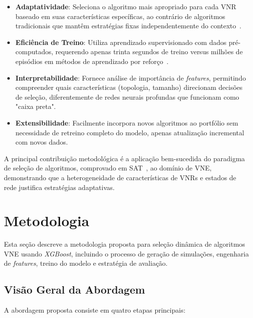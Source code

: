 \documentclass[conference]{IEEEtran}
\begin{document}
\begin{itemize}
    \item \textbf{Adaptatividade}: Seleciona o algoritmo mais apropriado para cada VNR baseado em suas características específicas, ao contrário de algoritmos tradicionais que mantêm estratégias fixas independentemente do contexto~\cite{fischer2013vne-survey}.

    \item \textbf{Eficiência de Treino}: Utiliza aprendizado supervisionado com dados pré-computados, requerendo apenas trinta segundos de treino versus milhões de episódios em métodos de aprendizado por reforço~\cite{cao2018nfv-deeprl,tsc-2023-hrl-acra,ijcai-2024-flagvne}.

    \item \textbf{Interpretabilidade}: Fornece análise de importância de \textit{features}, permitindo compreender quais características (topologia, tamanho) direcionam decisões de seleção, diferentemente de redes neurais profundas que funcionam como "caixa preta".

    \item \textbf{Extensibilidade}: Facilmente incorpora novos algoritmos ao portfólio sem necessidade de retreino completo do modelo, apenas atualização incremental com novos dados.

\end{itemize}

A principal contribuição metodológica é a aplicação bem-sucedida do paradigma de seleção de algoritmos, comprovado em SAT~\cite{xu2012satzilla}, ao domínio de VNE, demonstrando que a heterogeneidade de características de VNRs e estados de rede justifica estratégias adaptativas.

\section{Metodologia}
\label{sec:Proposal}

Esta seção descreve a metodologia proposta para seleção dinâmica de algoritmos VNE usando \textit{XGBoost}, incluindo o processo de geração de simulações, engenharia de \textit{features}, treino do modelo e estratégia de avaliação.

\subsection{Visão Geral da Abordagem}

A abordagem proposta consiste em quatro etapas principais:
\end{document}
